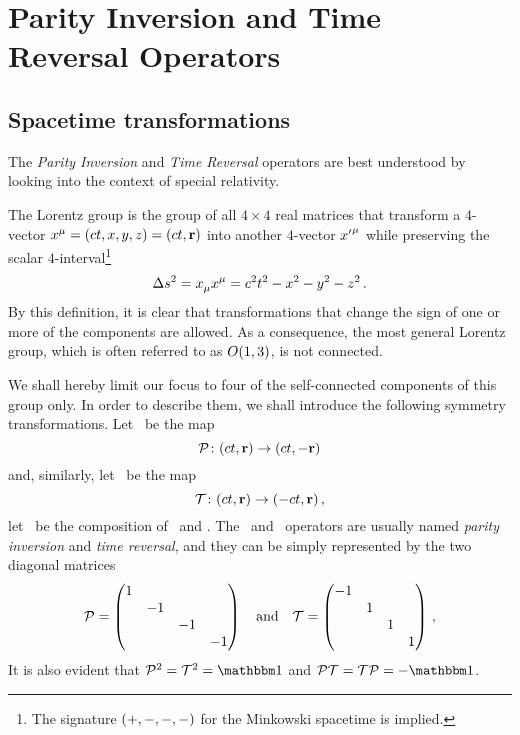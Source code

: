\chapter{Parity Inversion and Time Reversal Operators}\label{ch:pt-operators}
    \section{Spacetime transformations}
        The \emph{Parity Inversion} and \emph{Time Reversal} operators are best understood by looking into the context of special relativity.

        The Lorentz group is the group of all $4\times4$ real matrices that transform a $4$-vector $\tensor{x}{^\mu} = \pqty{ct,x,y,z} = \pqty{ct,\vb{r}}$ into another $4$-vector $\tensor{{x'}}{^\mu}$ while preserving the scalar $4$-interval\footnote{The signature $\pqty{+,-,-,-}$ for the Minkowski spacetime is implied.}
        \begin{equation}
            \label{eq:4-interval}
            \Delta s^2 = \tensor{x}{_\mu} \tensor{x}{^\mu} = c^2t^2 - x^2 - y^2 - z^2
            \myperiod
        \end{equation}
        By this definition, it is clear that transformations that change the sign of one or more of the components are allowed. As a consequence, the most general Lorentz group, which is often referred to as $O\pqty{1,3}$, is not connected.

        We shall hereby limit our focus to four of the self-connected components of this group only. In order to describe them, we shall introduce the following symmetry transformations. Let \mcP\ be the map 
        \begin{equation}
            \label{eq:lorentz-P}
            \func{\mcP}{\pqty{ct,\vb{r}}}{\pqty{ct,-\vb{r}}}
        \end{equation}
        and, similarly, let \mcT\ be the map
        \begin{equation}
            \label{eq:lorentz-T}
            \func{\mcT}{\pqty{ct,\vb{r}}}{\pqty{-ct,\vb{r}}}
            \mycomma
        \end{equation}
        let \PT\ be the composition of \mcP\ and \mcT.
        The \mcP\ and \mcT\ operators are usually named \emph{parity inversion} and \emph{time reversal}, and they can be simply represented by the two diagonal matrices
        \begin{equation*}
            \mcP = \pmqty{\dmat{1,-1,-1,-1}}
            \qand
            \mcT = \pmqty{\dmat{-1,1,1,1}}
            \mycomma
        \end{equation*}
        It is also evident that $\mcP^2 = \mcT^2 = \idM$ and $\PT = \mcT\mcP = -\idM$.
        
